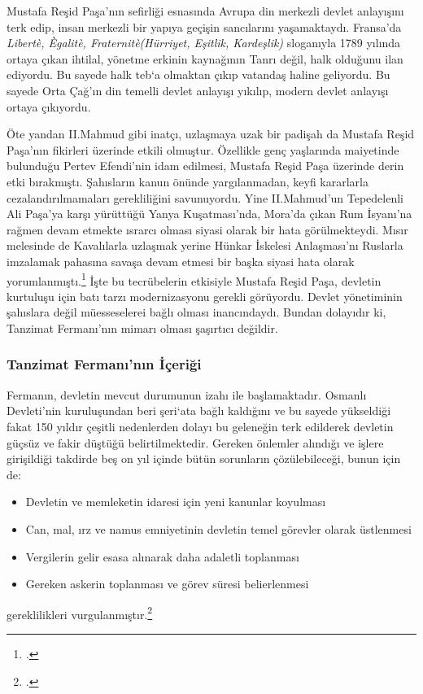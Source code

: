 Mustafa Reşid Paşa'nın sefirliği esnasında Avrupa din merkezli devlet anlayışını terk edip, insan merkezli bir yapıya geçişin sancılarını yaşamaktaydı. Fransa'da \textit{Libertè, Ègalitè, Fraternitè(Hürriyet, Eşitlik, Kardeşlik)} sloganıyla 1789 yılında ortaya çıkan ihtilal, 
yönetme erkinin kaynağının Tanrı değil, halk olduğunu ilan ediyordu. Bu sayede halk teb`a olmaktan çıkıp vatandaş haline geliyordu. Bu sayede Orta Çağ'ın din temelli devlet anlayışı yıkılıp, modern devlet anlayışı ortaya çıkıyordu. 

Öte yandan II.Mahmud gibi inatçı, uzlaşmaya uzak bir padişah da Mustafa Reşid Paşa'nın fikirleri üzerinde etkili olmuştur. Özellikle genç yaşlarında maiyetinde bulunduğu Pertev Efendi'nin idam edilmesi,
Mustafa Reşid Paşa üzerinde derin etki bırakmıştı. Şahısların kanun önünde yargılanmadan, keyfi kararlarla cezalandırılmamaları gerekliliğini savunuyordu. Yine II.Mahmud'un Tepedelenli Ali Paşa'ya karşı yürüttüğü Yanya Kuşatması'nda, Mora'da çıkan Rum İsyanı'na rağmen 
devam etmekte ısrarcı olması siyasi olarak bir hata görülmekteydi. Mısır melesinde de Kavalılarla uzlaşmak yerine Hünkar İskelesi Anlaşması'nı Ruslarla imzalamak pahasına savaşa devam etmesi bir başka siyasi hata olarak yorumlanmıştı.\footcite[143]{tanzimat} 
İşte bu tecrübelerin etkisiyle Mustafa Reşid Paşa, devletin kurtuluşu için batı tarzı modernizasyonu gerekli görüyordu. Devlet yönetiminin şahıslara değil müesseselerei bağlı olması inancındaydı. Bundan dolayıdır ki, Tanzimat Fermanı'nın mimarı olması şaşırtıcı değildir.

\subsubsection{Tanzimat Fermanı'nın İçeriği}
\indent\indent Fermanın, devletin mevcut durumunun izahı ile başlamaktadır. Osmanlı Devleti'nin kuruluşundan beri şeri`ata bağlı kaldığını ve bu sayede yükseldiği fakat 150 yıldır çeşitli nedenlerden dolayı bu geleneğin terk edilderek devletin 
güçsüz ve fakir düştüğü belirtilmektedir. Gereken önlemler alındığı ve işlere girişildiği takdirde beş on yıl içinde bütün sorunların çözülebileceği, bunun için de:
\begin{itemize}
    \item Devletin ve memleketin idaresi için yeni kanunlar koyulması
    \item Can, mal, ırz ve namus emniyetinin devletin temel görevler olarak üstlenmesi
    \item Vergilerin gelir esasa alınarak daha adaletli toplanması 
    \item Gereken askerin toplanması ve görev süresi belierlenmesi
\end{itemize}
gereklilikleri vurgulanmıştır.\footcite[100]{tanzimat} 

